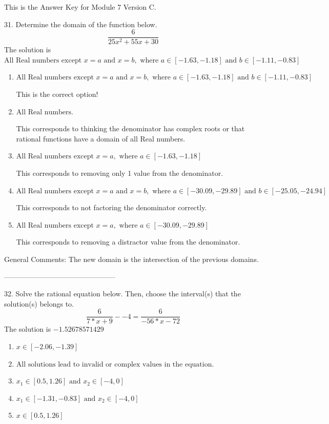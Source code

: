 \documentclass{article}[10pt]
\begin{document}
This is the Answer Key for Module 7 Version C.

31. Determine the domain of the function below.
$$ \frac{6}{25 x^2 + 55 x + 30} $$ 
The solution is $ \text{All Real numbers except } x = a \text{ and } x = b, \text{ where } a \in [-1.63, -1.18] \text{ and } b \in [-1.11, -0.83] $ 

\begin{enumerate}[label=\Alph*.] 
\item $ \text{All Real numbers except } x = a \text{ and } x = b, \text{ where } a \in [-1.63, -1.18] \text{ and } b \in [-1.11, -0.83] $ 

 This is the correct option! 
\item $ \text{All Real numbers.} $ 

 This corresponds to thinking the denominator has complex roots or that rational functions have a domain of all Real numbers. 
\item $ \text{All Real numbers except } x = a, \text{ where } a \in [-1.63, -1.18] $ 

 This corresponds to removing only 1 value from the denominator. 
\item $ \text{All Real numbers except } x = a \text{ and } x = b, \text{ where } a \in [-30.09, -29.89] \text{ and } b \in [-25.05, -24.94] $ 

 This corresponds to not factoring the denominator correctly. 
\item $ \text{All Real numbers except } x = a, \text{ where } a \in [-30.09, -29.89] $ 

 This corresponds to removing a distractor value from the denominator. 
\end{enumerate} 
 
General Comments: The new domain is the intersection of the previous domains.

-----------------------------------------------

32. Solve the rational equation below. Then, choose the interval(s) that the solution(s) belongs to.
$$ \frac{6}{7*x + 9} - -4 = \frac{6}{-56*x - 72} $$ 
The solution is $ -1.52678571429 $ 

\begin{enumerate}[label=\Alph*.] 
\item $ x \in [-2.06,-1.39] $ 

  
\item $ \text{All solutions lead to invalid or complex values in the equation.} $ 

  
\item $ x_1 \in [0.5, 1.26] \text{ and } x_2 \in [-4,0] $ 

  
\item $ x_1 \in [-1.31, -0.83] \text{ and } x_2 \in [-4,0] $ 

  
\item $ x \in [0.5,1.26] $ 

  
\end{enumerate} 
 
\end{document}
